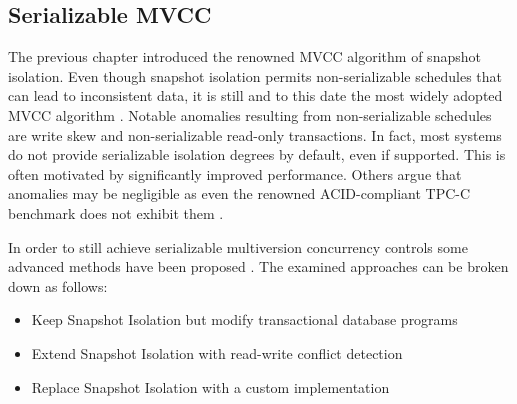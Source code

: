 \subsection{Serializable MVCC}

The previous chapter introduced the renowned MVCC algorithm of snapshot
isolation. Even though snapshot isolation permits non-serializable schedules
that can lead to inconsistent data, it is still and to this date the most widely
adopted MVCC algorithm \cite{cahill2009serializable, larson2011high,
sikka2012efficient, neumann2015fast}. Notable anomalies resulting from
non-serializable schedules are write skew and non-serializable read-only
transactions. In fact, most systems do not provide serializable isolation
degrees by default, even if supported. This is often motivated by significantly
improved performance. Others argue that anomalies may be negligible as even the
renowned ACID-compliant TPC-C benchmark does not exhibit them
\cite{fekete2005making}.

In order to still achieve serializable multiversion concurrency controls some
advanced methods have been proposed \cite{fekete2005making,
cahill2009serializable, neumann2015fast}. The examined approaches can be broken
down as follows:

\begin{itemize}
    \item Keep Snapshot Isolation but modify transactional database programs
    \item Extend Snapshot Isolation with read-write conflict detection
    \item Replace Snapshot Isolation with a custom implementation
\end{itemize}
